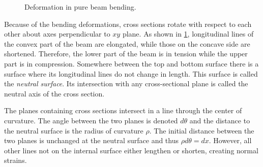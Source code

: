 \documentclass[
10pt,
a4paper,
openany,
svgnames,
]{book}
\begin{document}
\begin{figure}[h]
  \centering
  \caption{Deformation in pure beam bending.}
  \label{fig: pure bending}
\end{figure}


Because of the bending deformations, cross sections rotate with respect to each other about axes perpendicular to $xy$ plane. As shown in \cref{fig: pure bending}, longitudinal lines of the convex part of the beam are elongated, while those on the concave side are shortened. Therefore, the lower part of the beam is in tension while the upper part is in compression. Somewhere between the top and bottom surface there is a surface where its longitudinal lines do not change in length. This surface is called the \emph{neutral surface}. Its intersection with any cross-sectional plane is called the neutral axis of the cross section.

The planes containing cross sections intersect in a line through the center of curvature. The angle between the two planes is denoted $d\theta$ and the distance to the neutral surface is the radius of curvature $\rho$. The initial distance between the two planes is unchanged at the neutral surface and thus $\rho d \theta = dx$. However, all other lines not on the internal surface either lengthen or shorten, creating normal strains.
\end{document}
